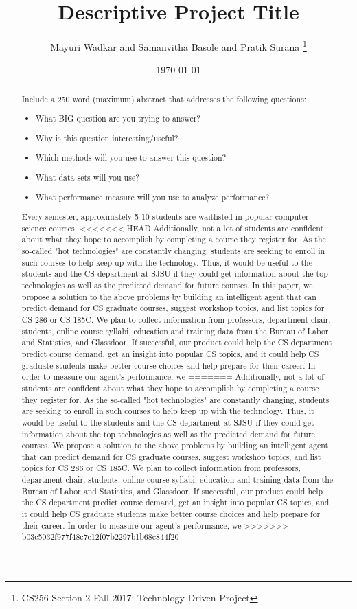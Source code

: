 \documentclass{article}
\title{Descriptive Project Title}
\author{Mayuri Wadkar and Samanvitha Basole and Pratik Surana
\thanks{CS256 Section 2 Fall 2017: Technology Driven Project}}
\date{\today}
\begin{document}
\maketitle

\begin{abstract}
Include a 250 word (maximum) abstract that addresses the following questions:
\begin{itemize}
\item What BIG question are you trying to answer?
\item Why is this question interesting/useful?
\item Which methods will you use to answer this question?
\item What data sets will you use?
\item What performance measure will you use to analyze performance?
\end{itemize}
Every semester, approximately 5-10 students are waitlisted in popular computer science courses. 
<<<<<<< HEAD
Additionally, not a lot of students are confident about what they hope to accomplish by completing a course they register for. As the so-called "hot technologies" are constantly changing, students are seeking to enroll in such courses to help keep up with the technology. Thus, it would be useful to the students and the CS department at SJSU if they could get information about the top technologies as well as the predicted demand for future courses. In this paper, we propose a solution to the above problems by building an intelligent agent that can predict demand for CS graduate courses, suggest workshop topics, and list topics for CS 286 or CS 185C. We plan to collect information from professors, department chair, students, online course syllabi, education and training data from the Bureau of Labor and Statistics, and Glassdoor. If successful, our product could help the CS department predict course demand, get an insight into popular CS topics, and it could help CS graduate students make better course choices and help prepare for their career. In order to measure our agent's performance, we 
=======
Additionally, not a lot of students are confident about what they hope to accomplish by completing a course they register for. As the so-called "hot technologies" are constantly changing, students are seeking to enroll in such courses to help keep up with the technology. Thus, it would be useful to the students and the CS department at SJSU if they could get information about the top technologies as well as the predicted demand for future courses. We propose a solution to the above problems by building an intelligent agent that can predict demand for CS graduate courses, suggest workshop topics, and list topics for CS 286 or CS 185C. We plan to collect information from professors, department chair, students, online course syllabi, education and training data from the Bureau of Labor and Statistics, and Glassdoor. If successful, our product could help the CS department predict course demand, get an insight into popular CS topics, and it could help CS graduate students make better course choices and help prepare for their career. In order to measure our agent's performance, we 
>>>>>>> b03c5032f977f48c7c12f07b2297b1b68c844f20
\end{abstract}
\end{document}
